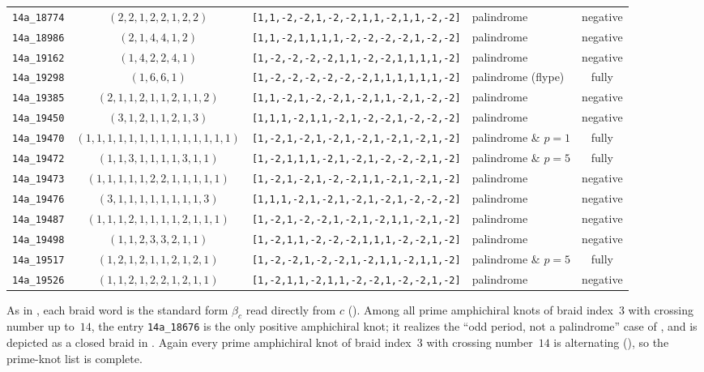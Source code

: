 \documentclass[11pt]{article}
\theoremstyle{definition}
\begin{document}
\begin{landscape}
\begin{longtable}{c c c l c}
\texttt{14a\_18774} & $(2,2,1,2,2,1,2,2)$ & \texttt{[1,1,-2,-2,1,-2,-2,1,1,-2,1,1,-2,-2]} & palindrome & negative\\
\texttt{14a\_18986} & $(2,1,4,4,1,2)$ & \texttt{[1,1,-2,1,1,1,1,-2,-2,-2,-2,1,-2,-2]} & palindrome & negative\\
\texttt{14a\_19162} & $(1,4,2,2,4,1)$ & \texttt{[1,-2,-2,-2,-2,1,1,-2,-2,1,1,1,1,-2]} & palindrome & negative\\
\texttt{14a\_19298} & $(1,6,6,1)$ & \texttt{[1,-2,-2,-2,-2,-2,-2,1,1,1,1,1,1,-2]} & palindrome (flype) & fully\\
\texttt{14a\_19385} & $(2,1,1,2,1,1,2,1,1,2)$ & \texttt{[1,1,-2,1,-2,-2,1,-2,1,1,-2,1,-2,-2]} & palindrome & negative\\
\texttt{14a\_19450} & $(3,1,2,1,1,2,1,3)$ & \texttt{[1,1,1,-2,1,1,-2,1,-2,-2,1,-2,-2,-2]} & palindrome & negative\\
\texttt{14a\_19470} & $(1,1,1,1,1,1,1,1,1,1,1,1,1,1)$ & \texttt{[1,-2,1,-2,1,-2,1,-2,1,-2,1,-2,1,-2]} & palindrome \& $p=1$ & fully\\
\texttt{14a\_19472} & $(1,1,3,1,1,1,1,3,1,1)$ & \texttt{[1,-2,1,1,1,-2,1,-2,1,-2,-2,-2,1,-2]} & palindrome \& $p=5$ & fully\\
\texttt{14a\_19473} & $(1,1,1,1,1,2,2,1,1,1,1,1)$ & \texttt{[1,-2,1,-2,1,-2,-2,1,1,-2,1,-2,1,-2]} & palindrome & negative\\
\texttt{14a\_19476} & $(3,1,1,1,1,1,1,1,1,3)$ & \texttt{[1,1,1,-2,1,-2,1,-2,1,-2,1,-2,-2,-2]} & palindrome & negative\\
\texttt{14a\_19487} & $(1,1,1,2,1,1,1,1,2,1,1,1)$ & \texttt{[1,-2,1,-2,-2,1,-2,1,-2,1,1,-2,1,-2]} & palindrome & negative\\
\texttt{14a\_19498} & $(1,1,2,3,3,2,1,1)$ & \texttt{[1,-2,1,1,-2,-2,-2,1,1,1,-2,-2,1,-2]} & palindrome & negative\\
\texttt{14a\_19517} & $(1,2,1,2,1,1,2,1,2,1)$ & \texttt{[1,-2,-2,1,-2,-2,1,-2,1,1,-2,1,1,-2]} & palindrome \& $p=5$ & fully\\
\texttt{14a\_19526} & $(1,1,2,1,2,2,1,2,1,1)$ & \texttt{[1,-2,1,1,-2,1,1,-2,-2,1,-2,-2,1,-2]} & palindrome & negative\\
\bottomrule
\end{longtable}
\normalsize

\smallskip
\noindent\footnotesize
As in , each braid word is the standard form $\beta_c$
read directly from $c$ (). Among all prime amphichiral knots
of braid index~$3$ with crossing number up to~$14$, the entry \texttt{14a\_18676} is the
only positive amphichiral knot; it realizes the ``odd period, not a palindrome'' case of
, and is depicted as a closed braid in .
Again every prime amphichiral knot of braid index~$3$ with crossing number~$14$
is alternating (), so the prime-knot list is complete.
\end{landscape}
\end{document}

